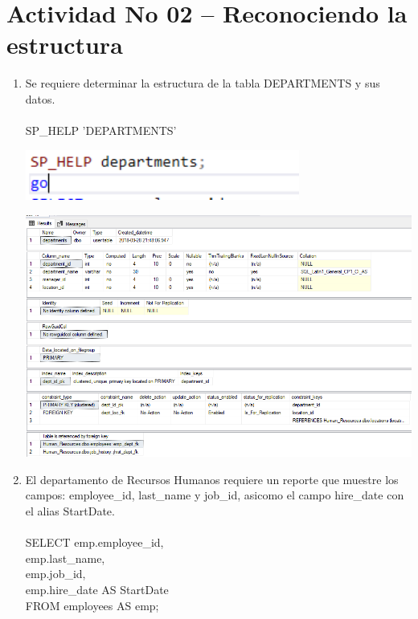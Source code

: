 \section{Actividad No 02 – Reconociendo la estructura} 

\begin{enumerate}[1.]
	\item Se requiere determinar la estructura de la tabla DEPARTMENTS y sus datos.
	\\
	\\SP\_HELP 'DEPARTMENTS'

	\begin{center}
	\includegraphics[width=9cm]{./Imagenes/actividad_02_01a} 
	\end{center}

	\begin{center}
	\includegraphics[width=15cm]{./Imagenes/actividad_02_01} 
	\end{center}

	\item El departamento de Recursos Humanos requiere un reporte que muestre los campos: employee\_id, last\_name y job\_id, asicomo el campo hire\_date con el alias StartDate.
	\\
	\\SELECT emp.employee\_id, \\
	emp.last\_name, \\
	emp.job\_id, \\
	emp.hire\_date AS StartDate \\
	FROM employees AS emp; 


\end{enumerate}
